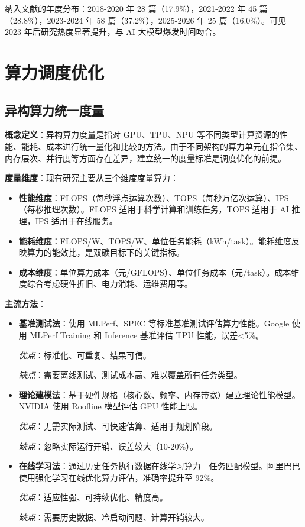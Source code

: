 \documentclass[12pt,a4paper]{article}
\begin{document}
纳入文献的年度分布：2018-2020 年 28 篇（17.9\%），2021-2022 年 45 篇（28.8\%），2023-2024 年 58 篇（37.2\%），2025-2026 年 25 篇（16.0\%）。可见 2023 年后研究热度显著提升，与 AI 大模型爆发时间吻合。

\section{算力调度优化}
\label{sec:compute}

\subsection{异构算力统一度量}

\textbf{概念定义}：异构算力度量是指对 GPU、TPU、NPU 等不同类型计算资源的性能、能耗、成本进行统一量化和比较的方法。由于不同架构的算力单元在指令集、内存层次、并行度等方面存在差异，建立统一的度量标准是调度优化的前提\cite{gao2023energy}。

\textbf{度量维度}：现有研究主要从三个维度度量算力：

\begin{itemize}
    \item \textbf{性能维度}：FLOPS（每秒浮点运算次数）、TOPS（每秒万亿次运算）、IPS（每秒推理次数）。FLOPS 适用于科学计算和训练任务，TOPS 适用于 AI 推理，IPS 适用于在线服务。
    
    \item \textbf{能耗维度}：FLOPS/W、TOPS/W、单位任务能耗（kWh/task）。能耗维度反映算力的能效比，是双碳目标下的关键指标。
    
    \item \textbf{成本维度}：单位算力成本（元/GFLOPS）、单位任务成本（元/task）。成本维度综合考虑硬件折旧、电力消耗、运维费用等。
\end{itemize}

\textbf{主流方法}：

\begin{itemize}
    \item \textbf{基准测试法}：使用 MLPerf、SPEC 等标准基准测试评估算力性能。Google 使用 MLPerf Training 和 Inference 基准评估 TPU 性能，误差<5\%。
    
    \textit{优点}：标准化、可重复、结果可信。
    
    \textit{缺点}：需要离线测试、测试成本高、难以覆盖所有任务类型。
    
    \item \textbf{理论建模法}：基于硬件规格（核心数、频率、内存带宽）建立理论性能模型。NVIDIA 使用 Roofline 模型评估 GPU 性能上限。
    
    \textit{优点}：无需实际测试、可快速估算、适用于规划阶段。
    
    \textit{缺点}：忽略实际运行开销、误差较大（10-20\%）。
    
    \item \textbf{在线学习法}：通过历史任务执行数据在线学习算力 - 任务匹配模型。阿里巴巴使用强化学习在线优化算力评估，准确率提升至 92\%\cite{caict2024compute}。
    
    \textit{优点}：适应性强、可持续优化、精度高。
    
    \textit{缺点}：需要历史数据、冷启动问题、计算开销较大。
\end{itemize}
\end{document}
